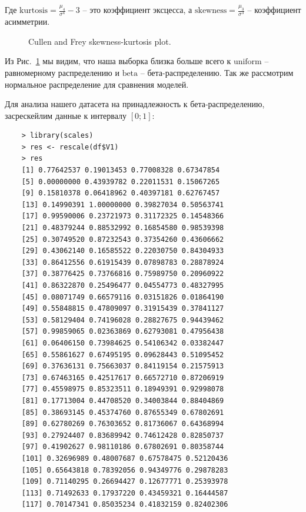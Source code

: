 \documentclass[14pt,a4paper]{scrartcl}
\begin{document}
Где $\text{kurtosis} = \frac{\mu_4}{\sigma^4} - 3$ -- это коэффициент эксцесса, а $\text{skewness} = \frac{\mu_3}{\sigma^3} $ -- коэффициент асимметрии.

\begin{figure}[t!]
	\caption{Cullen and Frey skewness-kurtosis plot.}
	\label{ris:cullen_and_frey_graph}
\end{figure}

\pagebreak
Из Рис.~\ref{ris:cullen_and_frey_graph} мы видим, что наша выборка близка больше всего к $\text{uniform}$ -- равномерному распределению и $\text{beta}$ -- бета-распределению. Так же рассмотрим нормальное распределение для сравнения моделей.

Для анализа нашего датасета на принадлежность к бета-распределению, засрескейлим данные к интервалу $[0;1]$:
\begin{lstlisting}
	> library(scales)
	> res <- rescale(df$V1)
	> res
	[1] 0.77642537 0.19013453 0.77008328 0.67347854
	[5] 0.00000000 0.43939782 0.22011531 0.15067265
	[9] 0.15810378 0.06418962 0.40397181 0.62767457
	[13] 0.14990391 1.00000000 0.39827034 0.50563741
	[17] 0.99590006 0.23721973 0.31172325 0.14548366
	[21] 0.48379244 0.88532992 0.16854580 0.98539398
	[25] 0.30749520 0.87232543 0.37354260 0.43606662
	[29] 0.43062140 0.16585522 0.22030750 0.84304933
	[33] 0.86412556 0.61915439 0.07898783 0.28878924
	[37] 0.38776425 0.73766816 0.75989750 0.20960922
	[41] 0.86322870 0.25496477 0.04554773 0.48327995
	[45] 0.08071749 0.66579116 0.03151826 0.01864190
	[49] 0.55848815 0.47809097 0.31915439 0.37841127
	[53] 0.58129404 0.74196028 0.28827675 0.94439462
	[57] 0.99859065 0.02363869 0.62793081 0.47956438
	[61] 0.06406150 0.73984625 0.54106342 0.03382447
	[65] 0.55861627 0.67495195 0.09628443 0.51095452
	[69] 0.37636131 0.75663037 0.84119154 0.21575913
	[73] 0.67463165 0.42517617 0.66572710 0.87206919
	[77] 0.45598975 0.85323511 0.18949391 0.92998078
	[81] 0.17713004 0.44708520 0.34003844 0.88404869
	[85] 0.38693145 0.45374760 0.87655349 0.67802691
	[89] 0.62780269 0.76303652 0.81736067 0.64368994
	[93] 0.27924407 0.83689942 0.74612428 0.82850737
	[97] 0.41902627 0.98110186 0.67802691 0.80358744
	[101] 0.32696989 0.48007687 0.67578475 0.52120436
	[105] 0.65643818 0.78392056 0.94349776 0.29878283
	[109] 0.71140295 0.26694427 0.12677771 0.25393978
	[113] 0.71492633 0.17937220 0.43459321 0.16444587
	[117] 0.70147341 0.85035234 0.41832159 0.82402306
\end{lstlisting}
\end{document}

